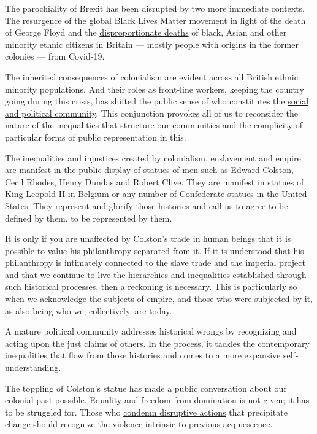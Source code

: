 The parochiality of Brexit has been disrupted by two more immediate
contexts. The resurgence of the global Black Lives Matter movement in
light of the death of George Floyd and the
\href{https://www.theguardian.com/world/2020/jun/02/covid-19-death-rate-in-england-higher-among-bame-people}{disproportionate
deaths} of black, Asian and other minority ethnic citizens in Britain
--- mostly people with origins in the former colonies --- from Covid-19.

The inherited consequences of colonialism are evident across all British
ethnic minority populations. And their roles as front-line workers,
keeping the country going during this crisis, has shifted the public
sense of who constitutes the
\href{https://discoversociety.org/2020/04/22/rethinking-brexit-in-the-light-of-covid-19/}{social
and political community}. This conjunction provokes all of us to
reconsider the nature of the inequalities that structure our communities
and the complicity of particular forms of public representation in this.

The inequalities and injustices created by colonialism, enslavement and
empire are manifest in the public display of statues of men such as
Edward Colston, Cecil Rhodes, Henry Dundas and Robert Clive. They are
manifest in statues of King Leopold II in Belgium or any number of
Confederate statues in the United States. They represent and glorify
those histories and call us to agree to be defined by them, to be
represented by them.

It is only if you are unaffected by Colston's trade in human beings that
it is possible to value his philanthropy separated from it. If it is
understood that his philanthropy is intimately connected to the slave
trade and the imperial project and that we continue to live the
hierarchies and inequalities established through such historical
processes, then a reckoning is necessary. This is particularly so when
we acknowledge the subjects of empire, and those who were subjected by
it, as also being who we, collectively, are today.

A mature political community addresses historical wrongs by recognizing
and acting upon the just claims of others. In the process, it tackles
the contemporary inequalities that flow from those histories and comes
to a more expansive self-understanding.

The toppling of Colston's statue has made a public conversation about
our colonial past possible. Equality and freedom from domination is not
given; it has to be struggled for. Those who
\href{https://www.theguardian.com/politics/live/2020/jun/08/uk-coronavirus-johnson-says-anti-racist-protests-were-subverted-by-thuggery-live-news-covid19-updates}{condemn
disruptive actions} that precipitate change should recognize the
violence intrinsic to previous acquiescence.

